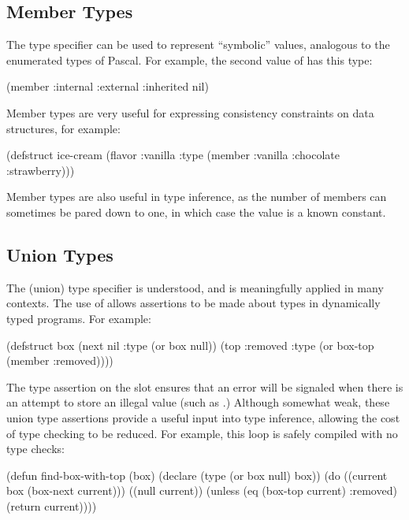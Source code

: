 \subsection{Member Types}

The  type specifier can be used to represent
``symbolic'' values, analogous to the enumerated types of Pascal.  For
example, the second value of  has this type:
\begin{lisp}
(member :internal :external :inherited nil)
\end{lisp}
Member types are very useful for expressing consistency constraints on data
structures, for example:
\begin{lisp}
(defstruct ice-cream
  (flavor :vanilla :type (member :vanilla :chocolate :strawberry)))
\end{lisp}
Member types are also useful in type inference, as the number of members can
sometimes be pared down to one, in which case the value is a known constant.


\subsection{Union Types}

The  (union) type specifier is understood, and is
meaningfully applied in many contexts.  The use of  allows
assertions to be made about types in dynamically typed programs.  For
example:

\begin{lisp}
(defstruct box
  (next nil :type (or box null))
  (top :removed :type (or box-top (member :removed))))
\end{lisp}

The type assertion on the  slot ensures that an error will be signaled
when there is an attempt to store an illegal value (such as .)
Although somewhat weak, these union type assertions provide a useful input into
type inference, allowing the cost of type checking to be reduced.  For example,
this loop is safely compiled with no type checks:

\begin{lisp}
(defun find-box-with-top (box)
  (declare (type (or box null) box))
  (do ((current box (box-next current)))
      ((null current))
    (unless (eq (box-top current) :removed)
      (return current))))
\end{lisp}

